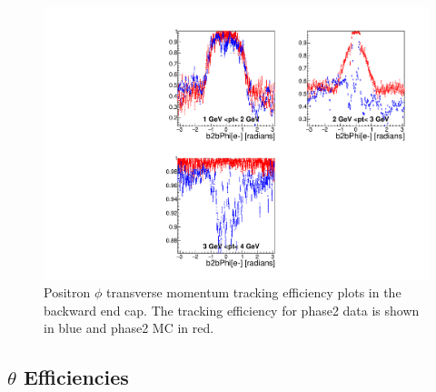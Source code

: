 \documentclass[a4paper,11pt,twosided,final,german,openbib,pdftex,listof=totoc,bibliography=totoc]{scrbook}
\begin{document}
\begin{figure}[!htbp]
	\centering
	\includegraphics[width=\textwidth]{Plots/master/xPtMPhiepEC}
	\caption[Transverse Momentum $\phi$ Positron backward end cap Efficiency Phase2]{Positron $\phi$ transverse momentum tracking efficiency plots in the backward end cap. The tracking efficiency for phase2 data is shown in blue and phase2 MC in red.
		\label{plt:xPtMPhiepEC}	}
\end{figure}

\newpage











\subsection{$\theta$ Efficiencies}
\end{document}
